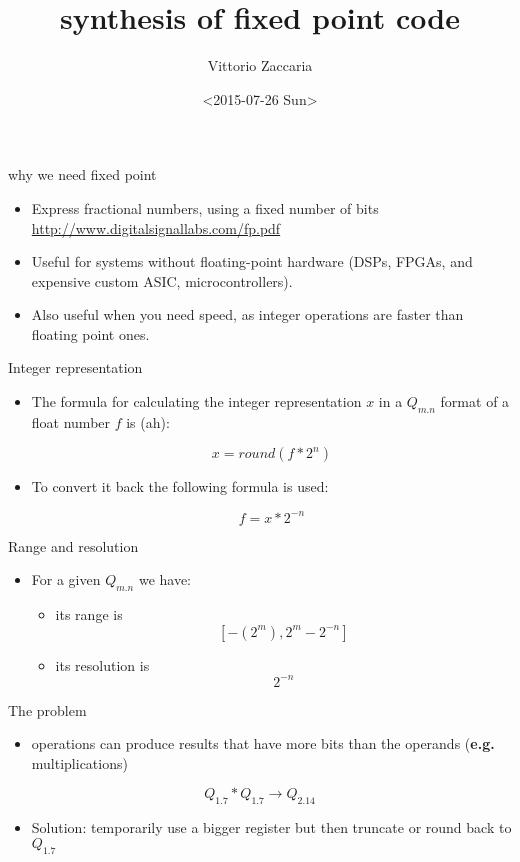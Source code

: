 \documentclass[ignorenonframetext,,aspectratio=169]{beamer}
\title{synthesis of fixed point code}
\author{Vittorio Zaccaria}
\date{\textless{}2015-07-26 Sun\textgreater{}}
\providecommand{\tightlist}{%
  \setlength{\itemsep}{0pt}\setlength{\parskip}{0pt}}
\begin{document}
\frame{\titlepage}

\begin{frame}{why we need fixed point}

\begin{itemize}
\item
  Express fractional numbers, using a fixed number of bits
  \url{http://www.digitalsignallabs.com/fp.pdf}
\item
  Useful for systems without floating-point hardware (DSPs, FPGAs, and
  expensive custom ASIC, microcontrollers).
\item
  Also useful when you need speed, as integer operations are faster than
  floating point ones.
\end{itemize}

\end{frame}

\begin{frame}{Integer representation}

\begin{itemize}
\item
  The formula for calculating the integer representation \(x\) in a
  \(Q_{m.n}\) format of a float number \(f\) is (ah):

  \[x = round(f * 2^n)\]
\item
  To convert it back the following formula is used:

  \[f = x * 2^{-n}\]
\end{itemize}

\end{frame}

\begin{frame}{Range and resolution}

\begin{itemize}
\item
  For a given \(Q_{m.n}\) we have:

  \begin{itemize}
  \item
    its range is \[[ - (2^m) , 2^m -2^{-n}]\]
  \item
    its resolution is \[2^{-n}\]
  \end{itemize}
\end{itemize}

\end{frame}

\begin{frame}{The problem}

\begin{itemize}
\tightlist
\item
  operations can produce results that have more bits than the operands
  (\textbf{e.g.} multiplications)
\end{itemize}

\[Q_{1.7} * Q_{1.7} \rightarrow Q_{2.14}\]

\begin{itemize}
\tightlist
\item
  Solution: temporarily use a bigger register but then truncate or round
  back to \(Q_{1.7}\)
\end{itemize}

\end{frame}
\end{document}
